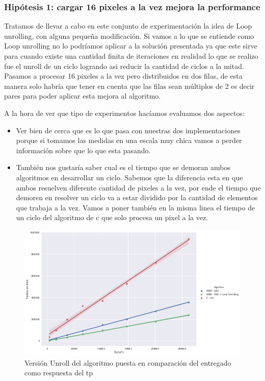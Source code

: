 \subsubsection*{Hipótesis 1: cargar 16 pixeles a la vez mejora la performance}
Tratamos de llevar a cabo en este conjunto de experimentación la idea de Loop unrolling, con alguna pequeña modificación. Si vamos a lo que se entiende como Loop unrolling no lo podríamos aplicar a la solución presentada ya que este sirve para cuando existe una cantidad finita de iteraciones en realidad lo que se realizo fue el unroll de un ciclo logrando asi reducir la cantidad de ciclos a la mitad. Pasamos a procesar 16 pixeles a la vez pero distribuidos en dos filas, de esta manera solo habría que tener en cuenta que las filas sean múltiplos de 2 es decir pares para poder aplicar esta mejora al algoritmo.

A la hora de ver que tipo de experimentos hacíamos evaluamos dos aspectos:
\begin{itemize}
\item Ver bien de cerca que es lo que pasa con nuestras dos implementaciones porque si tomamos las medidas en una escala muy chica vamos a perder información sobre que lo que esta pasando. 

\item También nos gustaría saber cual es el tiempo que se demoran ambos algoritmos en desarrollar un ciclo. Sabemos que la diferencia esta en que ambos resuelven diferente cantidad de  pixeles a la vez, por ende el tiempo que demoren en resolver un ciclo va a estar dividido por la cantidad de elementos que trabaja a la vez. Vamos a poner también en la misma linea el tiempo de un ciclo del algoritmo de c que solo procesa un pixel a la vez.
\end{itemize}
\begin{figure}[H]
	\centering
	\includegraphics[scale=0.5]{img/fourCombine_UnrollvsNormal.png}
	\caption{Versión Unroll del algoritmo puesta en comparación del entregado como respuesta del tp}
	\label{fourCombine_unroolvsnormal}
\end{figure}

